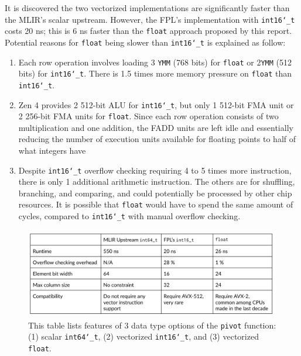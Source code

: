 \documentclass[logo,bsc,singlespacing,parskip]{infthesis}
\newcommand{\dtshort}{\texttt{int16\char`_t}}
\newcommand{\dtlong}{\texttt{int64\char`_t}}
\newcommand{\dtfloat}{\texttt{float}}
\newcommand{\pivot}{\texttt{pivot}}
\newcommand{\ymm}{\texttt{YMM}}
\begin{document}
It is discovered the two vectorized implementations are significantly faster than the MLIR's scalar upstream. However, the FPL's implementation with \dtshort{}~\cite{FPL2} costs 20 ns; this is 6 ns faster than the \dtfloat{} approach proposed by this report. Potential reasons for \dtfloat{} being slower than \dtshort{} is explained as follow:
\begin{enumerate}
    \item Each row operation involves loading 3 \ymm{} (768 bits) for \dtfloat{} or 2\ymm{} (512 bits) for \dtshort{}. There is 1.5 times more memory pressure on \dtfloat{} than \dtshort{}. 
    \item Zen 4 provides 2 512-bit ALU for \dtshort{}, but only 1 512-bit FMA unit or 2 256-bit FMA units for \dtfloat{}. Since each row operation consists of two multiplication and one addition, the FADD units are left idle and essentially reducing the number of execution units available for floating points to half of what integers have
    \item Despite \dtshort{} overflow checking requiring 4 to 5 times more instruction, there is only 1 additional arithmetic instruction. The others are for shuffling, branching, and comparing, and could potentially be processed by other chip resources. It is possible that \dtfloat{} would have to spend the same amount of cycles, compared to \dtshort{} with manual overflow checking. 
\end{enumerate}




\begin{figure}[H]
    \begin{center}
        \includegraphics[width=\linewidth]{image/i16-3ymmf32-upstream-table.png}
    \end{center}
    \caption{ This table lists features of 3 data type options of the \pivot{} function: (1) scalar \dtlong{}, (2) vectorized \dtshort{}, and (3) vectorized \dtfloat{}.
    }
    \label{fig:i16-3ymmf32-upstream-table}
\end{figure}
\end{document}
